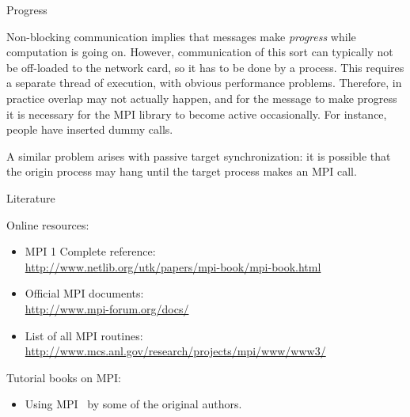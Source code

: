 
 {Progress}

Non-blocking communication implies that messages make \emph{progress}
while computation is going on. However, communication of this sort can 
typically not be off-loaded to the network card, so it has to be done by 
a process. This requires a separate thread of execution, with
obvious performance problems. Therefore, in practice overlap may
not actually happen, and for the message to make progress
it is necessary for the MPI library to become active occasionally.
For instance, people have inserted dummy  calls.

A similar problem arises with passive target synchronization:
it is possible that the origin process may hang until 
the target process makes an MPI call.


 {Literature}

Online resources:
\begin{itemize}
\item MPI 1 Complete reference:\\ \url{http://www.netlib.org/utk/papers/mpi-book/mpi-book.html}
\item Official MPI documents:\\ \url{http://www.mpi-forum.org/docs/}
\item List of all MPI routines:\\ \url{http://www.mcs.anl.gov/research/projects/mpi/www/www3/}
\end{itemize}

Tutorial books on MPI:
\begin{itemize}
\item Using MPI~\cite{Gropp:UsingMPI1} by some of the original authors.
\end{itemize}

\endinput

Examples: 
compute pi
mandelbrot set
